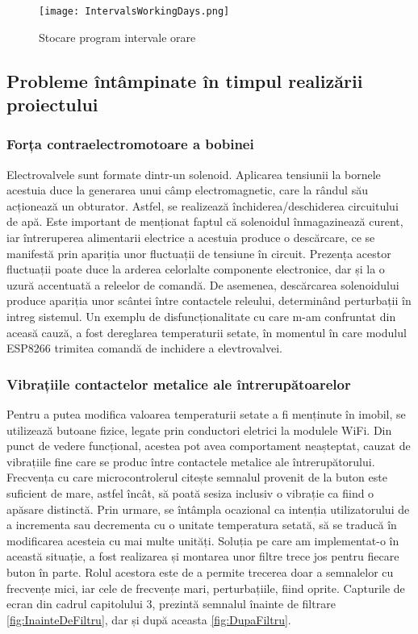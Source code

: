 \begin{figure}[H]
   	\centering
    	\texttt{[image: IntervalsWorkingDays.png]}
	\caption{Stocare program intervale orare}
\end{figure}

\subsection{Probleme întâmpinate în timpul realizării proiectului}

\subsubsection{Forța contraelectromotoare a bobinei}

	Electrovalvele sunt formate dintr-un solenoid. Aplicarea tensiunii la bornele acestuia duce la generarea unui câmp electromagnetic, care la rândul său acționează un obturator. Astfel, se realizează închiderea/deschiderea circuitului de apă. Este important de menționat faptul că solenoidul înmagazinează curent, iar întreruperea alimentarii electrice a acestuia produce o descărcare, ce se manifestă prin apariția unor fluctuații de tensiune în circuit. Prezența acestor fluctuații poate duce la arderea celorlalte componente electronice, dar și la o uzură accentuată a releelor de comandă. De asemenea, descărcarea solenoidului produce apariția unor scântei între contactele releului, determinând perturbații în intreg sistemul. Un exemplu de disfuncționalitate cu care m-am confruntat din aceasă cauză, a fost dereglarea temperaturii setate, în momentul în care modulul ESP8266 trimitea comandă de inchidere a elevtrovalvei.   

\subsubsection{Vibrațiile contactelor metalice ale întrerupătoarelor}

	Pentru a putea modifica valoarea temperaturii setate a fi menținute în imobil, se utilizează butoane fizice, legate prin conductori eletrici la modulele WiFi. Din punct de vedere funcțional, acestea pot avea comportament neașteptat, cauzat de vibrațiile fine care se produc între contactele metalice ale întrerupătorului. Frecvența cu care microcontrolerul citește semnalul provenit de la buton este suficient de mare, astfel încât, să poată sesiza inclusiv o vibrație ca fiind o apăsare distinctă. Prin urmare, se întâmpla ocazional ca intenția utilizatorului de a incrementa sau decrementa cu o unitate temperatura setată, să se traducă în modificarea acesteia cu mai multe unități. Soluția pe care am implementat-o în această situație, a fost realizarea și montarea unor filtre trece jos pentru fiecare buton în parte. Rolul acestora este de a permite trecerea doar a semnalelor cu frecvențe mici, iar cele de frecvențe mari, perturbațiile, fiind oprite. Capturile de ecran din cadrul capitolului 3, prezintă semnalul înainte de filtrare \ref{fig:InainteDeFiltru}, dar și după aceasta \ref{fig:DupaFiltru}.

